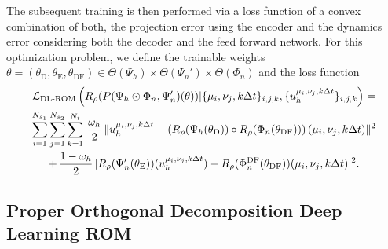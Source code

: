 The subsequent training is then performed via a loss function of a convex combination of both, 
the projection error using the encoder and the dynamics error considering both the decoder and 
the feed forward network. For this optimization problem, we define 
the trainable weights $\theta = (\theta_\text{D}, \theta_\text{E}, \theta_\text{DF}) 
\in \Theta(\Psi_h) \times \Theta(\Psi_n') \times \Theta(\Phi_n)$ and the loss function
\begin{multline} \label{eq: loss function dl rom}
    \mathcal{L}_\text{DL-ROM}\left(R_\rho(P(\Psi_h \odot \Phi_n, \Psi_n')(\theta)) \vert \{\mu_i, \nu_j, k \Delta t\}_{i,j,k}, 
    \{u_h^{\mu_i, \nu_j, k \Delta t} \}_{i,j,k}\right) =  \\
        \sum_{i=1}^{N_{s_1}} \sum_{j=1}^{N_{s_2}} 
        \sum_{k = 1}^{N_t} \, \frac{\omega_h}{2} \, 
        \lVert u_h^{\mu_i, \nu_j, k \Delta t} - 
        \left(R_\rho(\Psi_h(\theta_\text{D})) \circ R_\rho(\Phi_n(\theta_\text{DF}))\right) (\mu_i, \nu_j, k \Delta t) \rVert^2 \\
        + \, \frac{1 - \omega_h}{2} \, \lvert R_\rho(\Psi'_n(\theta_\text{E}))(u_h^{\mu_i, \nu_j, k \Delta t}) 
        - R_\rho(\Phi_n^\text{DF}(\theta_\text{DF}))(\mu_i, \nu_j, k \Delta t) \rvert^2.
\end{multline}





\subsection{Proper Orthogonal Decomposition Deep Learning ROM} \label{subsec: pod-dl-rom}




